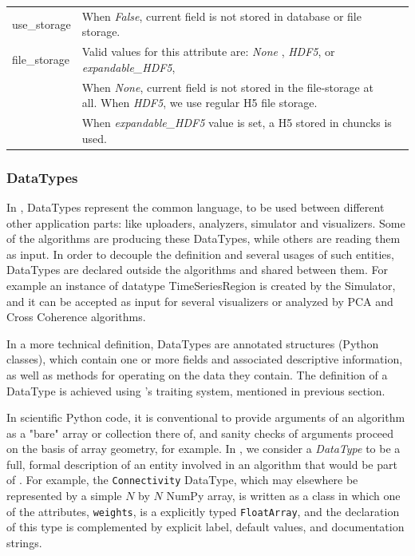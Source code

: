 \begin{center}
\begin{table}[ht]
\begin{tabularx}{\textwidth}{lll}
		use\_storage	& When \emph{False}, current field is not stored in database or file storage. \\
		file\_storage	& Valid values for this attribute are: \emph{None} , \emph{HDF5}, or  \emph{expandable\_HDF5}, \\
					& When \emph{None}, current field is not stored in the file-storage at all. When \emph{HDF5}, we use regular H5 file storage. \\
					& When \emph{expandable\_HDF5} value is set, a H5 stored in chuncks is used. \\
		\bottomrule
    	\end{tabularx}
	\end{table}
\end{center}


	\subsubsection{DataTypes}

In \TVB, DataTypes represent the common language, to be used between different other application parts: 
like uploaders, analyzers, simulator and visualizers.
Some of the algorithms are producing these DataTypes, while others are reading them as input. 
In order to decouple the definition and several usages of such entities, DataTypes are declared outside the algorithms 
and shared between them. For example an instance of datatype TimeSeriesRegion is created by the Simulator, 
and it can be accepted as input for several visualizers or analyzed by PCA and Cross Coherence algorithms.

In a more technical definition, \TVB DataTypes are annotated structures (Python classes), which
contain one or more fields and associated descriptive information, as
well as methods for operating on the data they contain. The definition of a
DataType is achieved using \TVB's traiting system, mentioned in previous section.

In scientific Python code, it is conventional to provide arguments
of an algorithm as a "bare" array or collection there of, and sanity
checks of arguments proceed on the basis of array geometry, for example.
In \TVB, we consider a \textit{DataType} to be a full, formal description of 
an entity involved in an algorithm that would be part of \TVB. 
For example, the \texttt{Connectivity} DataType, which may elsewhere
be represented by a simple $N$ by $N$ NumPy array, is written as a class
in which one of the attributes, \texttt{weights}, is a explicitly typed 
\texttt{FloatArray}, and the declaration of this type is complemented by
explicit label, default values, and documentation strings. 

